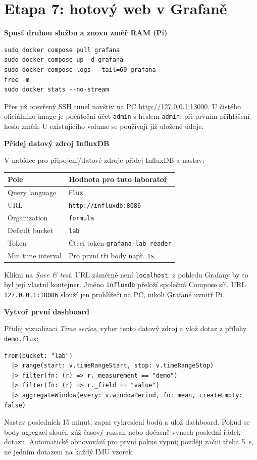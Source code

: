 \documentclass[11pt,a4paper]{article}
\newcommand{\krok}[1]{\par\noindent\textbf{#1}\par}
\begin{document}
\clearpage
\section{Etapa 7: hotový web v Grafaně}
\krok{Spusť druhou službu a znovu změř RAM (Pi)}
\begin{lstlisting}
sudo docker compose pull grafana
sudo docker compose up -d grafana
sudo docker compose logs --tail=60 grafana
free -m
sudo docker stats --no-stream
\end{lstlisting}
Přes již otevřený SSH tunel navštiv na PC \url{http://127.0.0.1:13000}. U čistého oficiálního image je počáteční účet \texttt{admin} s heslem \texttt{admin}; při prvním přihlášení heslo změň. U existujícího volume se používají již uložené údaje.\cite{grafana-start,grafana-docker}

\krok{Přidej datový zdroj InfluxDB}
V nabídce pro připojení/datové zdroje přidej InfluxDB a nastav:
\par\noindent\begin{tabularx}{\textwidth}{L{40mm}Y}
\toprule Pole & Hodnota pro tuto laboratoř\\\midrule
Query language & \texttt{Flux}\\
URL & \texttt{http://influxdb:8086}\\
Organization & \texttt{formula}\\
Default bucket & \texttt{lab}\\
Token & Čtecí token \texttt{grafana-lab-reader}\\
Min time interval & Pro první tři body např. \texttt{1s}\\
\bottomrule
\end{tabularx}\par
Klikni na \emph{Save \& test}. URL záměrně není \texttt{localhost}: z pohledu Grafany by to byl její vlastní kontejner. Jméno \texttt{influxdb} přeloží společná Compose síť. URL \texttt{127.0.0.1:18086} slouží jen prohlížeči na PC, nikoli Grafaně uvnitř Pi.\cite{grafana-influx}

\krok{Vytvoř první dashboard}
Přidej vizualizaci \emph{Time series}, vyber tento datový zdroj a vlož dotaz z přílohy \texttt{demo.flux}:
\begin{lstlisting}
from(bucket: "lab")
  |> range(start: v.timeRangeStart, stop: v.timeRangeStop)
  |> filter(fn: (r) => r._measurement == "demo")
  |> filter(fn: (r) => r._field == "value")
  |> aggregateWindow(every: v.windowPeriod, fn: mean, createEmpty: false)
\end{lstlisting}
Nastav posledních 15 minut, zapni vykreslení bodů a ulož dashboard. Pokud se body agregací sloučí, zúž časový rozsah nebo dočasně vynech poslední řádek dotazu. Automatické obnovování pro první pokus vypni; později začni třeba 5~s, ne jedním dotazem na každý IMU vzorek.
\end{document}
